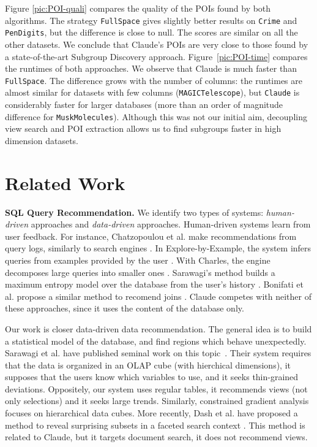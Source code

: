 Figure \ref{pic:POI-quali} compares the quality of the POIs found by both
algorithms. The strategy \texttt{FullSpace} gives slightly better results on
\texttt{Crime} and \texttt{PenDigits}, but the difference is close to null. The
scores are similar on all the other datasets. We conclude that Claude's POIs
are very close to those found by a state-of-the-art Subgroup Discovery approach.
Figure~\ref{pic:POI-time} compares the runtimes of both approaches.  We observe
that Claude is much faster than \texttt{FullSpace}. The difference grows with
the number of columns: the runtimes are almost similar for datasets with few
columns (\texttt{MAGICTelescope}), but \texttt{Claude} is considerably faster
for larger databases (more than an order of magnitude difference for
\texttt{MuskMolecules}). Although this was not our initial aim, decoupling view
search and POI extraction allows us to find subgroups faster in high dimension
datasets.

\section{Related Work}
\label{sec:related}

\textbf{SQL Query Recommendation.} We identify two types of systems:
\emph{human-driven} approaches and \emph{data-driven} approaches. Human-driven
systems learn from user feedback. For instance, Chatzopoulou et al.  make
recommendations from query logs, similarly to search engines
\cite{chatzopoulou2009query}. In Explore-by-Example, the system infers queries from
examples provided by the user \cite{dimitriadou2014explore}. With Charles, the
engine decomposes large queries into smaller ones \cite{sellam2013meet}.
Sarawagi's method builds a maximum entropy model over the database from the
user's history \cite{sarawagi2000user}. Bonifati et al. propose a similar
method to recomend joins \cite{bonifati2014interactive}.  Claude competes with
neither of these approaches, since it uses the content of the database only.

Our work is closer data-driven data recommendation. The general idea is to
build a statistical model of the database, and find regions which behave
unexpectedly. Sarawagi et al. have published seminal work on this
topic~\cite{sarawagi1998discovery}. Their system requires that the data is
organized in an OLAP cube (with hierchical dimensions), it supposes that the
users know which variables to use, and it seeks thin-grained deviations.
Oppositely, our system uses regular tables, it recommends views (not only
selections) and it seeks large trends. Similarly, constrained gradient
analysis~\cite{imielinski2002cubegrades, dong2001mining} focuses on
hierarchical data cubes. More recently, Dash et al. have proposed a method to
reveal surprising subsets in a faceted search context \cite{dash2008dynamic}.
This method is related to Claude, but it targets document search, it does not
recommend views.

